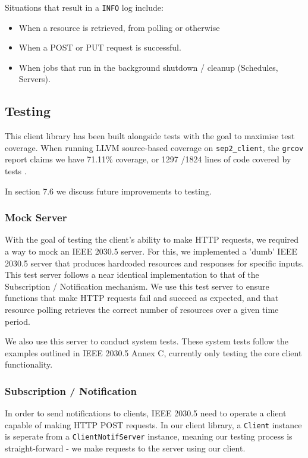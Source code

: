 Situations that result in a \texttt{INFO} log include:

\begin{itemize}
    \item When a resource is retrieved, from polling or otherwise
    \item When a POST or PUT request is successful.
    \item When jobs that run in the background shutdown / cleanup (Schedules, Servers).
\end{itemize}

\subsection{Testing}
This client library has been built alongside tests with the goal to maximise test coverage. When running LLVM source-based coverage on \texttt{sep2\_client}, the \texttt{grcov} report claims we have 71.11\% coverage, or 1297 \slash 1824 lines of code covered by tests \cite{grcov} \cite{llvmcov}. 

In section 7.6 we discuss future improvements to testing.

\subsubsection{Mock Server}
With the goal of testing the client's ability to make HTTP requests, we required a way to mock an IEEE 2030.5 server. For this, we implemented a 'dumb' IEEE 2030.5 server that produces hardcoded resources and responses for specific inputs. This test server follows a near identical implementation to that of the Subscription / Notification mechanism. We use this test server to ensure functions that make HTTP requests fail and succeed as expected, and that resource polling retrieves the correct number of resources over a given time period. 

We also use this server to conduct system tests. These system tests follow the examples outlined in IEEE 2030.5 Annex C, currently only testing the core client functionality.

\subsubsection{Subscription / Notification}
In order to send notifications to clients, IEEE 2030.5 need to operate a client capable of making HTTP POST requests. In our client library, a \texttt{Client} instance is seperate from a \texttt{ClientNotifServer} instance, meaning our testing process is straight-forward - we make requests to the server using our client. 

